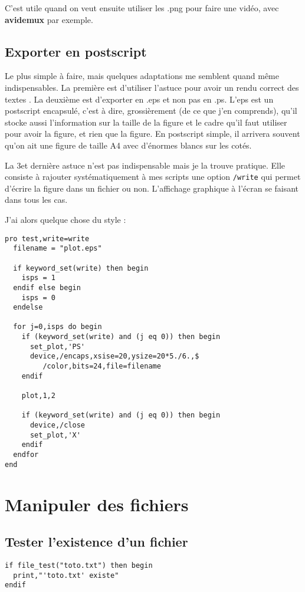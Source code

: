 \documentclass[a4paper,twoside]{article}
\begin{document}
C'est utile quand on veut ensuite utiliser les .png pour faire une vidéo, avec \textbf{avidemux} par exemple.

\subsection{Exporter en postscript}
Le plus simple à faire, mais quelques adaptations me semblent quand même indispensables. La première est d'utiliser l'astuce pour avoir un rendu correct des textes . La deuxième est d'exporter en .eps et non pas en .ps. L'eps est un postscript encapsulé, c'est à dire, grossièrement (de ce que j'en comprends), qu'il stocke aussi l'information sur la taille de la figure et le cadre qu'il faut utiliser pour avoir la figure, et rien que la figure. En postscript simple, il arrivera souvent qu'on ait une figure de taille A4 avec d'énormes blancs sur les cotés.

La 3\ieme et dernière astuce n'est pas indispensable mais je la trouve pratique. Elle consiste à rajouter systématiquement à mes scripts une option \texttt{/write} qui permet d'écrire la figure dans un fichier ou non. L'affichage graphique à l'écran se faisant dans tous les cas.

J'ai alors quelque chose du style :
\begin{lstlisting}[language=IDL]
pro test,write=write
  filename = "plot.eps"

  if keyword_set(write) then begin
    isps = 1
  endif else begin
    isps = 0
  endelse

  for j=0,isps do begin
    if (keyword_set(write) and (j eq 0)) then begin
      set_plot,'PS'
      device,/encaps,xsise=20,ysize=20*5./6.,$
	     /color,bits=24,file=filename
    endif

    plot,1,2

    if (keyword_set(write) and (j eq 0)) then begin
      device,/close
      set_plot,'X'
    endif
  endfor
end
\end{lstlisting}


\section{Manipuler des fichiers}
\subsection{Tester l'existence d'un fichier}
\begin{lstlisting}[language=IDL]
if file_test("toto.txt") then begin
  print,"'toto.txt' existe"
endif
\end{lstlisting}
\end{document}

